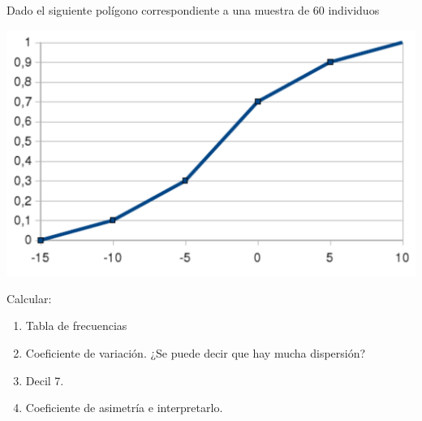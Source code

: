 {Dado el siguiente polígono correspondiente a una muestra de 60 individuos
\begin{center}
\includegraphics[scale=0.5]{img/poligono-acumuladas-des-43}
\end{center}
Calcular:
\begin{enumerate}
\item Tabla de frecuencias
\item Coeficiente de variación. ¿Se puede decir que hay mucha dispersión?
\item Decil 7.
\item Coeficiente de asimetría e interpretarlo.
\end{enumerate}
}


